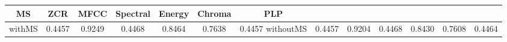 \begin{tabular}{|c|c|c|c|c|c|c} \hline 
MS &ZCR &MFCC &Spectral &Energy &Chroma &PLP \\ \hline
withMS&0.4457&0.9249&0.4468&0.8464&0.7638&0.4457\hline
withoutMS&0.4457&0.9204&0.4468&0.8430&0.7608&0.4464\hline
\end{tabular}
